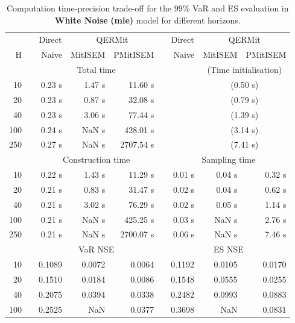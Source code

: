 \footnotesize{  
{ \renewcommand{\arraystretch}{1.3} 
\begin{longtable}{rr rrr r rrr}  
\caption{Computation time-precision trade-off for the  $99\%$ VaR and ES evaluation in \textbf{White Noise} \textbf{(mle)} model for different horizons.} 
\label{tab:time_precision_WN_ML} \\ 
 & & \multicolumn{1}{c}{Direct} & \multicolumn{2}{c}{QERMit}&  & \multicolumn{1}{c}{Direct} & \multicolumn{2}{c}{QERMit} \\ \cline{3-5} \cline{7-9} 
 H & & Naive & MitISEM & PMitISEM & & Naive & MitISEM & PMitISEM \\ \hline 
 & & \multicolumn{3}{c}{Total time} & & & \multicolumn{2}{c}{(Time initialisation)}  \\ \cline{3-5} \cline{8-9}
10 & & 0.23 s & 1.47 s & 11.60 s &&& \multicolumn{2}{c}{(0.50 s)} \\ 
20 & & 0.23 s & 0.87 s & 32.08 s &&& \multicolumn{2}{c}{(0.79 s)} \\ 
40 & & 0.23 s & 3.06 s & 77.44 s &&& \multicolumn{2}{c}{(1.39 s)} \\ 
100 & & 0.24 s &  NaN s & 428.01 s &&& \multicolumn{2}{c}{(3.14 s)} \\ 
250 & & 0.27 s &  NaN s & 2707.54 s &&& \multicolumn{2}{c}{(7.41 s)} \\ 
\hline 
 & & \multicolumn{3}{c}{Construction time} & & \multicolumn{3}{c}{ Sampling time} \\ \cline{3-5}  \cline{7-9}
10 & & 0.22 s & 1.43 s & 11.29 s &&  0.01 s & 0.04 s & 0.32 s \\ 
20 & & 0.21 s & 0.83 s & 31.47 s &&  0.02 s & 0.04 s & 0.62 s \\ 
40 & & 0.21 s & 3.02 s & 76.29 s &&  0.02 s & 0.05 s & 1.14 s \\ 
100 & & 0.21 s &  NaN s & 425.25 s &&  0.03 s &  NaN s & 2.76 s \\ 
250 & & 0.21 s &  NaN s & 2700.07 s &&  0.06 s &  NaN s & 7.46 s \\ 
\hline 
 & & \multicolumn{3}{c}{VaR NSE} &&  \multicolumn{3}{c}{ES NSE} \\ \cline{3-5}  \cline{7-9}
10 && 0.1089  & 0.0072  & 0.0064 && 0.1192  & 0.0105  & 0.0170  \\ 
20 && 0.1510  & 0.0184  & 0.0086 && 0.1548  & 0.0555  & 0.0255  \\ 
40 && 0.2075  & 0.0394  & 0.0338 && 0.2482  & 0.0993  & 0.0883  \\ 
100 && 0.2525  &    NaN  & 0.0377 && 0.3698  &    NaN  & 0.0831  \\ 

\end{longtable}}}
